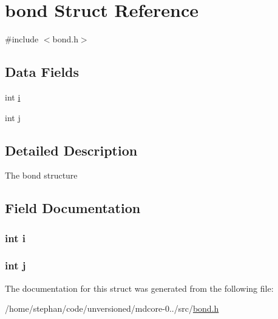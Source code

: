 \hypertarget{structbond}{\section{bond Struct Reference}
\label{structbond}
}


{\ttfamily \#include $<$bond.\-h$>$}

\subsection*{Data Fields}
\begin{DoxyCompactItemize}
\item 
int \hyperlink{structbond_acb559820d9ca11295b4500f179ef6392}{i}
\item 
int \hyperlink{structbond_a37d972ae0b47b9099e30983131d31916}{j}
\end{DoxyCompactItemize}


\subsection{Detailed Description}
The bond structure 

\subsection{Field Documentation}
\hypertarget{structbond_acb559820d9ca11295b4500f179ef6392}{
\subsubsection[{i}]{\setlength{\rightskip}{0pt plus 5cm}int i}}\label{structbond_acb559820d9ca11295b4500f179ef6392}
\hypertarget{structbond_a37d972ae0b47b9099e30983131d31916}{
\subsubsection[{j}]{\setlength{\rightskip}{0pt plus 5cm}int j}}\label{structbond_a37d972ae0b47b9099e30983131d31916}


The documentation for this struct was generated from the following file\-:\begin{DoxyCompactItemize}
\item 
/home/stephan/code/unversioned/mdcore-\/0../src/\hyperlink{bond_8h}{bond.\-h}\end{DoxyCompactItemize}
